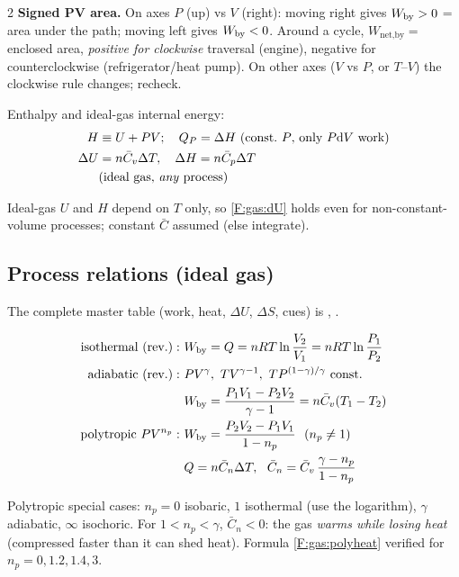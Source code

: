 \begin{multicols}{2}
\textbf{Signed PV area.} On axes $P$ (up) vs $V$ (right): moving right gives $W_{\mathrm{by}}>0$ = area under the path; moving left gives $W_{\mathrm{by}}<0$. Around a cycle, $W_{\text{net,by}}=$ enclosed area, \emph{positive for clockwise} traversal (engine), negative for counterclockwise (refrigerator/heat pump). On other axes ($V$ vs $P$, or $T$--$V$) the clockwise rule changes; recheck.

\begin{formulabox}Enthalpy and ideal-gas internal energy:
\begin{align}
H &\equiv U+PV;\quad Q_P=\Delta H\ \text{(const.\ }P\text{, only }P\mathrm{d} V\text{ work)} \label{F:energy:enthalpy}\\
\Delta U &= n\bar C_v\Delta T,\quad \Delta H=n\bar C_p\Delta T \label{F:gas:dU}\\
&\text{(ideal gas, \emph{any} process)}\notag
\end{align}
\end{formulabox}
Ideal-gas $U$ and $H$ depend on $T$ only, so \eqref{F:gas:dU} holds even for non-constant-volume processes; constant $\bar C$ assumed (else integrate).

\subsection{Process relations (ideal gas)}\label{sec:processes}
\CORE{} The complete master table (work, heat, $\Delta U$, $\Delta S$, cues) is , .
\begin{formulabox}
\vspace{-6pt}
\begin{align}
\text{isothermal (rev.)}:\ & \Wby=Q=nRT\ln\frac{V_2}{V_1}=nRT\ln\frac{P_1}{P_2} \label{F:gas:isothermal-work}\\
\text{adiabatic (rev.)}:\ & PV^\gamma,\ TV^{\gamma-1},\ TP^{(1-\gamma)/\gamma}\ \text{const.} \label{F:gas:adiabat}\\
& \Wby=\frac{P_1V_1-P_2V_2}{\gamma-1}=n\bar C_v(T_1-T_2) \label{F:gas:adiabatic-work}\\
\text{polytropic }PV^{n_p}:\ & \Wby=\frac{P_2V_2-P_1V_1}{1-n_p}\ \ (n_p\ne1) \label{F:gas:polytropic}\\
& Q=n\bar C_{n}\Delta T,\ \ \bar C_{n}=\bar C_v\,\frac{\gamma-n_p}{1-n_p} \label{F:gas:polyheat}
\end{align}
\end{formulabox}
Polytropic special cases: $n_p=0$ isobaric, $1$ isothermal (use the logarithm), $\gamma$ adiabatic, $\infty$ isochoric. For $1<n_p<\gamma$, $\bar C_n<0$: the gas \emph{warms while losing heat} (compressed faster than it can shed heat). Formula \eqref{F:gas:polyheat} verified for $n_p=0,1.2,1.4,3$.


\end{multicols}
